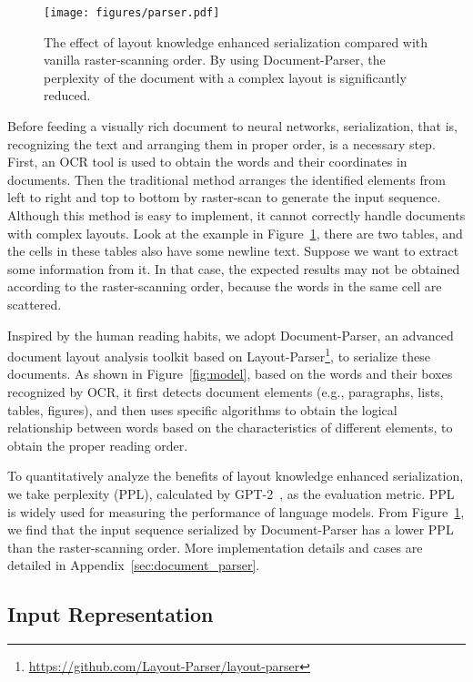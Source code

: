 \documentclass[11pt]{article}
\begin{document}
\begin{figure}[t]
    \texttt{[image: figures/parser.pdf]}
    \caption{The effect of layout knowledge enhanced serialization compared with vanilla raster-scanning order. By using Document-Parser, the perplexity of the document with a complex layout is significantly reduced.}
    \label{fig:parser_example}
\end{figure}

Before feeding a visually rich document to neural networks, serialization, that is, recognizing the text and arranging them in proper order, is a necessary step.
First, an OCR tool is used to obtain the words and their coordinates in documents. Then the traditional method arranges the identified elements from left to right and top to bottom by raster-scan to generate the input sequence.
Although this method is easy to implement, it cannot correctly handle documents with complex layouts.
Look at the example in Figure~\ref{fig:parser_example}, there are two tables, and the cells in these tables also have some newline text. Suppose we want to extract some information from it. In that case, the expected results may not be obtained according to the raster-scanning order, because the words in the same cell are scattered.

Inspired by the human reading habits, we adopt Document-Parser, an advanced document layout analysis toolkit based on Layout-Parser\footnote{\url{https://github.com/Layout-Parser/layout-parser}}, to serialize these documents.
As shown in Figure~\ref{fig:model}, based on the words and their boxes recognized by OCR, it first detects document elements (e.g., paragraphs, lists, tables, figures), and then uses specific algorithms to obtain the logical relationship between words based on the characteristics of different elements, to obtain the proper reading order.

To quantitatively analyze the benefits of layout knowledge enhanced serialization, we take perplexity (PPL), calculated by GPT-2~\cite{radford2019language}, as the evaluation metric. PPL is widely used for measuring the performance of language models. 
From Figure~\ref{fig:parser_example}, we find that the input sequence serialized by Document-Parser has a lower PPL  than the raster-scanning order. More implementation details and cases are detailed in Appendix~\ref{sec:document_parser}.

\subsection{Input Representation}
\end{document}
